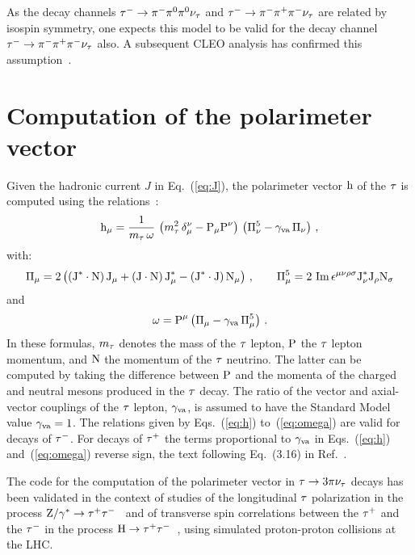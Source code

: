As the decay channels $\Pgtm \to \Pgpm\Pgpz\Pgpz\Pgngt$ and $\Pgtm \to \Pgpm\Pgpp\Pgpm\Pgngt$ are related by isospin symmetry, one expects this model to be valid for the decay channel $\Pgtm \to \Pgpm\Pgpp\Pgpm\Pgngt$ also.
A subsequent CLEO analysis has confirmed this assumption~\cite{Shibata:2002uv}.


\section{Computation of the polarimeter vector}
\label{sec:PolarimeterVector}

Given the hadronic current $J$ in Eq.~(\ref{eq:J}),
the polarimeter vector $\h$ of the $\Pgt$ is computed using the relations~\cite{Jadach:1990mz,Kuhn:1982di}:
\begin{equation}
\h_{\mu} = \frac{1}{\mtau \, \omega} \, \left( \mtau^{2} \, \delta_{\mu}^{\nu} - \P_{\mu} \P^{\nu} \right) \, \left( \Pi^{5}_{\nu} - \gammava \, \Pi_{\nu}\right) \, ,
\label{eq:h}
\end{equation}
with:
\begin{equation}
\Pi_{\mu} = 2 \left( (\Jstar \cdot \N) \, \J_{\mu} + (\J \cdot \N) \, \Jstar_{\mu} - (\Jstar \cdot \J) \, \N_{\mu} \right) \, , \quad \quad \Pi^{5}_{\mu} = 2 \, \operatorname{Im} \epsilon^{\mu\nu\rho\sigma} \Jstar_{\nu} \J_{\rho} \N_{\sigma}
\label{eq:Pi}
\end{equation}
and
\begin{equation}
\omega = \P^{\mu} \left( \Pi_{\mu} - \gammava \, \Pi^{5}_{\mu} \right) \, .
\label{eq:omega}
\end{equation}
In these formulas, $\mtau$ denotes the mass of the $\Pgt$ lepton,
$\P$ the $\Pgt$ lepton momentum, and $\N$ the momentum of the $\Pgt$ neutrino. The latter can be computed by taking the difference between $\P$ and the momenta of the charged and neutral mesons produced in the $\Pgt$ decay.
The ratio of the vector and axial-vector couplings of the $\Pgt$ lepton, $\gammava$, is assumed to have the Standard Model value $\gammava = 1$.
The relations given by Eqs.~(\ref{eq:h}) to~(\ref{eq:omega}) are valid for decays of $\Pgtm$. For decays of $\Pgtp$ the terms proportional to $\gammava$ in Eqs.~(\ref{eq:h}) and~(\ref{eq:omega}) reverse sign, \cf the text following Eq.~(3.16) in Ref.~\cite{Jadach:1990mz}.

The code for the computation of the polarimeter vector in $\Pgt \to 3 \Pgp\Pgngt$ decays
has been validated in the context of studies of the longitudinal $\Pgt$ polarization in the process $\PZ/\Pggx \to \Pgtp\Pgtm$~\cite{Cherepanov:2018wop} and of transverse spin correlations between the $\Pgtp$ and the $\Pgtm$ in the process $\PH \to \Pgtp\Pgtm$~\cite{Cherepanov:2018yqb}, using simulated proton-proton collisions at the LHC.


